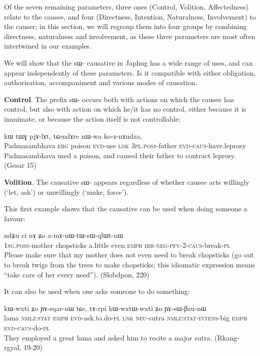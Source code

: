 \documentclass[oldfontcommands,oneside,a4paper,11pt]{article}
\newcommand{\ipa}[1]{{\phon \mbox{#1}}} %
\newcommand{\sg}{\textsc{sg}}
\newcommand{\pl}{\textsc{pl}}
\newcommand{\pfv}{\textsc{pfv}}
\newcommand{\caus}{\textsc{caus}}
\newcommand{\lnk}{\textsc{lnk}}
\newcommand{\erg}{\textsc{erg}}
\newcommand{\emphat}{\textsc{emph}}
\newcommand{\evd}{\textsc{evd}}
\newcommand{\intens}{\textsc{intens}}
\newcommand{\irr}{\textsc{irr}}
\newcommand{\negat}{\textsc{neg}}
\newcommand{\neu}{\textsc{neu}}
\newcommand{\nmlz}{\textsc{nmlz}}
\newcommand{\poss}{\textsc{poss}}
\newcommand{\stat}{\textsc{stat}}
\begin{document}
Of the seven remaining parameters, three ones (Control, Volition, Affectedness) relate to the causee, and four (Directness, Intention, Naturalness, Involvement) to the causer; in this section, we will regroup them into four groups by combining directness, naturalness and involvement, as these three parameters are most often intertwined in our examples.

 
 We will show that the \ipa{sɯ-} causative in Japhug has a wide range of uses, and can appear independently of these parameters. Is it compatible with either obligation, authorisation, accompaniment and various modes of causation. 
 
   \textbf{Control}. The prefix \ipa{sɯ-} occurs both with actions on which the causee has control, but also with action on which he/it has no control, either because it is inanimate, or because the action itself is not controllable:
 \begin{exe}
\ex 
\gll  \ipa{ɯrɟɤnpanma} 	\ipa{kɯ} 	\ipa{tɯɣ} 	\ipa{pjɤ-lɤt,} 	\ipa{tɕendɤre} 	\ipa{nɯ-wa} 	\ipa{ko-z-nɤndza,}  \\
Padmasambhava \erg{} poison \evd{}-use \lnk{} 3\pl{}.\poss{}-father \evd{}-\caus{}-have.leprosy \\
 \glt Padmasambhava used a poison, and caused their father to contract leprosy.    (Gesar 15)
\end{exe}

 \textbf{Volition}. The causative \ipa{sɯ-} appears regardless of whether causee acts willingly (`let, ask') or unwillingly (`make, force').
 
 This first example shows that the causative can be used when doing someone a favour:
  \begin{exe}
\ex 
\gll   \ipa{a-mu} 	\ipa{ndʑu} 	\ipa{ci} \ipa{nɤ}	\ipa{ʑo} 	\ipa{a-mɤ-nɯ-tɯ-sɯ-qlɯt-nɯ} \\
  1\sg{}.\poss{}-mother chopsticks a.little even \emphat{} \irr{}-\negat{}-\pfv{}-2-\caus{}-break-\pl{} \\
 \glt    Please make sure that my mother does not even need to break chopsticks (go out to break twigs from the trees to make chopsticks; this idiomatic expression means ``take care of her every need''). (Slobdpon, 220)
\end{exe}

 It can also be used when one asks someone to do something:
 \begin{exe}
\ex 
\gll  \ipa{βlama} 	\ipa{kɯ-wxti} 	\ipa{ʑo} 	\ipa{ɲɤ-sqar-nɯ} 	\ipa{tɕe,} 	\ipa{tɤ-rpi} 	\ipa{kɯ-wxtɯ-wxti} 	\ipa{ʑo} 	\ipa{ɲɤ-sɯ-βzu-nɯ}  \\
lama \nmlz{}:\stat{} \emphat{} \evd{}-ask.to.do-\pl{} \lnk{} \neu{}-sutra \nmlz{}:\stat{}-\intens{}-big \emphat{} \evd{}-\caus{}-do-\pl{} \\
 \glt   They employed a great lama and asked him to recite a major sutra. (Rkang-rgyal, 19-20)
\end{exe}
\end{document}
